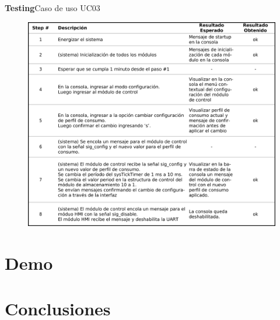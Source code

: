 \documentclass[11pt, xcolor={table,xcdraw}]{beamer}
\begin{document}
\begin{frame}[t]{\textbf{\LARGE{Testing}}}{Caso de uso UC03}
	\vspace{-.7cm}
	\begin{figure}[H]
	  \includegraphics[width=.77\textwidth]{./imagenes/UseCase_detalle3.png}
	\end{figure}	
\end{frame}



\section{Demo}


\section{Conclusiones}
\end{document}
